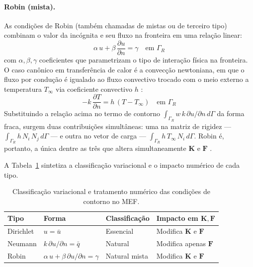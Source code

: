 \paragraph{Robin (mista).} As condições de Robin (também chamadas de mistas ou de terceiro tipo) combinam o valor da incógnita e seu fluxo na fronteira em uma relação linear:
\begin{equation}
\alpha\,u + \beta\,\frac{\partial u}{\partial n} = \gamma \quad \text{em } \Gamma_R
\label{eq:cc_robin}
\end{equation}
com $\alpha, \beta, \gamma$ coeficientes que parametrizam o tipo de interação física na fronteira. O caso canônico em transferência de calor é a convecção newtoniana, em que o fluxo por condução é igualado ao fluxo convectivo trocado com o meio externo a temperatura $T_\infty$ via coeficiente convectivo $h$ \cite{Incropera2006}:
\begin{equation}
-k\,\frac{\partial T}{\partial n} = h\,(T - T_\infty) \quad \text{em } \Gamma_R
\label{eq:cc_robin_convectiva}
\end{equation}
Substituindo a relação acima no termo de contorno $\int_{\Gamma_R} w\,k\,\partial u/\partial n\,d\Gamma$ da forma fraca, surgem duas contribuições simultâneas: uma na matriz de rigidez --- $\int_{\Gamma_R} h\,N_i\,N_j\,d\Gamma$ --- e outra no vetor de carga --- $\int_{\Gamma_R} h\,T_\infty\,N_i\,d\Gamma$. Robin é, portanto, a única dentre as três que altera simultaneamente $\mathbf{K}$ e $\mathbf{F}$ \cite{Reddy2005}.

A Tabela~\ref{tab:cc_resumo} sintetiza a classificação variacional e o impacto numérico de cada tipo.

\begin{table}[H]
\centering
\caption{Classificação variacional e tratamento numérico das condições de contorno no MEF.}
\label{tab:cc_resumo}
\begin{tabular}{llll}
\hline
\textbf{Tipo} & \textbf{Forma} & \textbf{Classificação} & \textbf{Impacto em $\mathbf{K},\mathbf{F}$} \\
\hline
Dirichlet & $u = \bar{u}$                                      & Essencial    & Modifica $\mathbf{K}$ e $\mathbf{F}$ \\
Neumann   & $k\,\partial u/\partial n = \bar{q}$               & Natural      & Modifica apenas $\mathbf{F}$ \\
Robin     & $\alpha\,u + \beta\,\partial u/\partial n = \gamma$ & Natural mista & Modifica $\mathbf{K}$ e $\mathbf{F}$ \\
\hline
\end{tabular}
\end{table}

